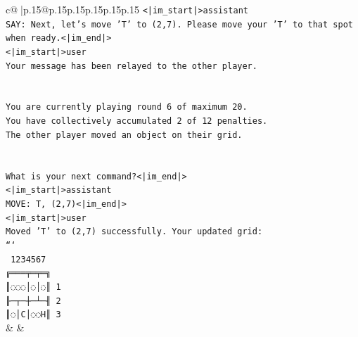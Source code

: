 \documentclass{article}
\begin{document}
{\begin{supertabular}{c@{$\;$}|p{.15\linewidth}@{}p{.15\linewidth}p{.15\linewidth}p{.15\linewidth}p{.15\linewidth}p{.15\linewidth}}
{{{\texttt{<|im\_start|>assistant} \\
\texttt{SAY: Next, let's move 'T' to (2,7). Please move your 'T' to that spot when ready.<|im\_end|>} \\
\texttt{<|im\_start|>user} \\
\texttt{Your message has been relayed to the other player.} \\
\\ 
\\ 
\texttt{You are currently playing round 6 of maximum 20.} \\
\texttt{You have collectively accumulated 2 of 12 penalties.} \\
\texttt{The other player moved an object on their grid.} \\
\\ 
\\ 
\texttt{What is your next command?<|im\_end|>} \\
\texttt{<|im\_start|>assistant} \\
\texttt{MOVE: T, (2,7)<|im\_end|>} \\
\texttt{<|im\_start|>user} \\
\texttt{Moved 'T' to (2,7) successfully. Your updated grid:} \\
\texttt{```} \\
\texttt{ 1234567} \\
\texttt{╔═══╤═╤═╗} \\
\texttt{║◌◌◌│◌│◌║ 1} \\
\texttt{╟─┬─┼─┴─╢ 2} \\
\texttt{║◌│C│◌◌H║ 3} \\
            }
        }
    }
    & & \\ \\


\end{supertabular}}
\end{document}
